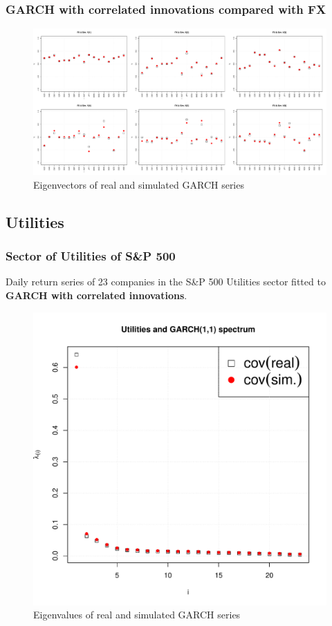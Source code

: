 \documentclass{beamer}
\begin{document}
\begin{frame}
  \frametitle{GARCH with correlated innovations compared with FX}
  \begin{figure}[htb!]
    \centering
    \includegraphics[scale=0.2]{FX_eigenvectors.pdf}
    \caption{\scriptsize Eigenvectors of real and simulated GARCH series}
  \end{figure}
\end{frame}

  
\subsection{Utilities}
\begin{frame}
  \frametitle{Sector of Utilities of S\&P 500}
  Daily return series of 23 companies in the S\&P 500 Utilities sector
  fitted to {\bf GARCH with correlated innovations}.
  \begin{figure}[htb!]
    \centering
    \includegraphics[scale=0.35]{Utilities_eigenvalues.pdf}
    \caption{\scriptsize Eigenvalues of real and simulated GARCH series}
  \end{figure}
\end{frame}
\end{document}
